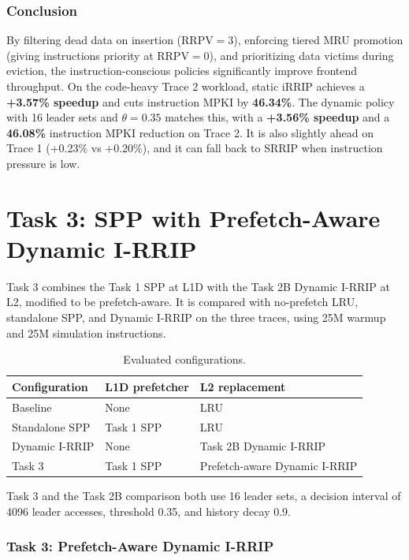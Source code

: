 \documentclass[11pt,a4paper]{article}
\begin{document}
\section{Conclusion}
By filtering dead data on insertion ($\text{RRPV} = 3$), enforcing tiered MRU promotion (giving instructions priority at $\text{RRPV} = 0$), and prioritizing data victims during eviction, the instruction-conscious policies significantly improve frontend throughput. On the code-heavy Trace 2 workload, static iRRIP achieves a \textbf{+3.57\% speedup} and cuts instruction MPKI by \textbf{46.34\%}. The dynamic policy with 16 leader sets and $\theta = 0.35$ matches this, with a \textbf{+3.56\% speedup} and a \textbf{46.08\%} instruction MPKI reduction on Trace 2. It is also slightly ahead on Trace 1 (+0.23\% vs +0.20\%), and it can fall back to SRRIP when instruction pressure is low.

\clearpage
\part{Task 3: SPP with Prefetch-Aware Dynamic I-RRIP}

Task 3 combines the Task 1 SPP at L1D with
the Task 2B Dynamic I-RRIP at L2, modified to be prefetch-aware. It is
compared with no-prefetch LRU, standalone SPP, and Dynamic I-RRIP on the
three traces, using 25M warmup and 25M simulation instructions.


\begin{table}[H]
\centering\small
\caption{Evaluated configurations.}
\begin{tabularx}{\linewidth}{lXX}
\toprule
Configuration & L1D prefetcher & L2 replacement \\
\midrule
Baseline & None & LRU \\
Standalone SPP & Task 1 SPP & LRU \\
Dynamic I-RRIP & None & Task 2B Dynamic I-RRIP \\
Task 3 & Task 1 SPP & Prefetch-aware Dynamic I-RRIP \\
\bottomrule
\end{tabularx}
\end{table}

Task 3 and the Task 2B comparison both use 16 leader sets, a decision
interval of 4096 leader accesses, threshold 0.35, and history decay 0.9.

\section{Task 3: Prefetch-Aware Dynamic I-RRIP}
\end{document}
